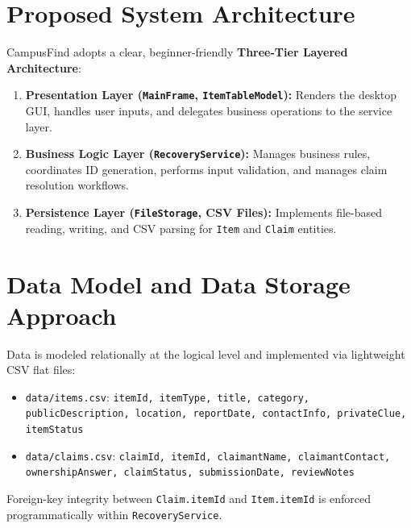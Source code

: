 \documentclass[11pt,a4paper]{article}
\begin{document}
\section{Proposed System Architecture}
CampusFind adopts a clear, beginner-friendly \textbf{Three-Tier Layered Architecture}:
\begin{enumerate}
    \item \textbf{Presentation Layer (\texttt{MainFrame}, \texttt{ItemTableModel}):} Renders the desktop GUI, handles user inputs, and delegates business operations to the service layer.
    \item \textbf{Business Logic Layer (\texttt{RecoveryService}):} Manages business rules, coordinates ID generation, performs input validation, and manages claim resolution workflows.
    \item \textbf{Persistence Layer (\texttt{FileStorage}, CSV Files):} Implements file-based reading, writing, and CSV parsing for \texttt{Item} and \texttt{Claim} entities.
\end{enumerate}

\section{Data Model and Data Storage Approach}
Data is modeled relationally at the logical level and implemented via lightweight CSV flat files:
\begin{itemize}
    \item \texttt{data/items.csv}: \texttt{itemId, itemType, title, category, publicDescription, location, reportDate, contactInfo, privateClue, itemStatus}
    \item \texttt{data/claims.csv}: \texttt{claimId, itemId, claimantName, claimantContact, ownershipAnswer, claimStatus, submissionDate, reviewNotes}
\end{itemize}
Foreign-key integrity between \texttt{Claim.itemId} and \texttt{Item.itemId} is enforced programmatically within \texttt{RecoveryService}.

\end{document}
